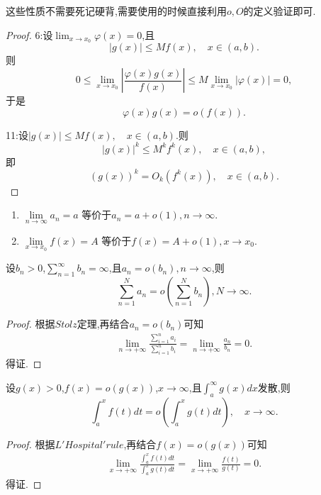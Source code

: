 \documentclass[lang=cn,newtx,10pt,scheme=chinese]{../Template/elegantbook}
\begin{document}
\begin{note}
这些性质不需要死记硬背,需要使用的时候直接利用$o,O$的定义验证即可.
\end{note}
\begin{proof}
    {\color[RGB]{128, 128, 0} 6:}设\(\lim_{x\to x_0}\varphi(x) = 0\),且
\[
|g(x)|\leq Mf(x),\quad x\in(a,b).
\]
则
\[
0\leq\lim_{x\to x_0}\left|\frac{\varphi(x)g(x)}{f(x)}\right|\leq M\lim_{x\to x_0}|\varphi(x)| = 0,
\]
于是
\[
\varphi(x)g(x)=o(f(x)).
\]

{\color[RGB]{128, 128, 0} 11:}设\(|g(x)|\leq Mf(x),\quad x\in(a,b)\).则
\[
|g(x)|^k\leq M^k f^k(x),\quad x\in(a,b),
\]
即
\[
(g(x))^k = O_k(f^k(x)),\quad x\in(a,b).
\]
\end{proof}

\begin{proposition}[极限的等价定义]\label{proposition:极限的等价定义(用o余项定义极限)}
\begin{enumerate}
\item $\underset{n\rightarrow \infty}{\lim}a_n=a$
等价于$a_n=a+o\left( 1 \right) ,n\rightarrow \infty$.

\item $\underset{x\rightarrow x_0}{\lim}f\left( x \right) =A$
等价于$f\left( x \right) =A+o\left( 1 \right) ,x\rightarrow x_0$.
\end{enumerate}

\end{proposition}

\begin{theorem}\label{theorem:发散级数的求和号与o可交换}
    设\(b_n>0\),\(\sum_{n = 1}^{\infty}b_n=\infty\),且\(a_n = o(b_n),n\to\infty\),则
\[
\sum_{n = 1}^{N}a_n=o\left(\sum_{n = 1}^{N}b_n\right),N\to\infty.
\]
\end{theorem}
\begin{proof}
    根据$Stolz$定理,再结合$a_n=o\left( b_n \right)$可知
    \begin{align*}
        \underset{n\rightarrow +\infty}{\lim}\frac{\sum\limits_{i=1}^n{a_i}}{\sum\limits_{i=1}^n{b_i}}=\underset{n\rightarrow +\infty}{\lim}\frac{a_n}{b_n}=0.
    \end{align*}得证.
\end{proof}

\begin{theorem}\label{theorem:发散积分的积分号与o可交换}
   设\(g(x)>0\),\(f(x)=o(g(x))\),\(x\to\infty\),且\(\int_{a}^{\infty}g(x)dx\)发散,则
\[
\int_{a}^{x}f(t)dt = o\left(\int_{a}^{x}g(t)dt\right),\quad x\to\infty.
\]
\end{theorem}
\begin{proof}
    根据$L'Hospital'rule$,再结合$f(x)=o(g(x))$可知
    \begin{align*}
        \underset{x\rightarrow +\infty}{\lim}\frac{\int_a^x{f\left( t \right) dt}}{\int_a^x{g\left( t \right) dt}}=\underset{x\rightarrow +\infty}{\lim}\frac{f\left( t \right)}{g\left( t \right)}=0.
    \end{align*}得证.
\end{proof}
\end{document}
